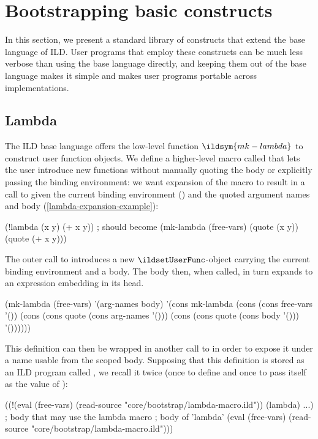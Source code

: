 \section{Bootstrapping basic constructs}
\label{bootstrapping-basic}
In this section, we present a standard library
of constructs that extend the base language of ILD. User programs that employ
these constructs can be much less verbose than using the base language directly,
and keeping them out of the base language makes it simple and makes user programs
portable
across implementations.
\subsection{Lambda}
\label{lambda-macro}
The ILD base language offers the low-level function \(\ildsym{mk-lambda}\) to construct
user function objects. We define a higher-level macro called  that
lets the user introduce new functions without manually quoting the body or explicitly
passing the binding environment: we want expansion of the 
macro to result in a call to  given the current binding environment
() and the quoted argument names and body (\cref{lambda-expansion-example}):
\begin{listingbox}\begin{ildcode}
(!lambda (x y) (+ x y))
; should become
(mk-lambda (free-vars) (quote (x y))
  (quote (+ x y)))
\end{ildcode}\end{listingbox}
\label{lambda-expansion-example}
The outer call to  introduces a new \(\ildsetUserFunc\)-object
carrying the current binding environment
and a body. The body then, when called, in turn
expands to an expression embedding  in its head.
\begin{listingbox}\begin{ildcode}
(mk-lambda
  (free-vars)
  '(arg-names body)
  '(cons mk-lambda
    (cons (cons free-vars '())
      (cons (cons quote (cons arg-names '()))
        (cons (cons quote (cons body '()))
          '())))))
\end{ildcode}\end{listingbox}
\label{lambda-macro-def}
This definition can then be wrapped in another call to  in order to expose
it under a  name usable from the scoped body. Supposing that
this definition is stored as an ILD program called ,
we recall it twice (once to define  and once to pass itself as the
value of ):
\begin{listingbox}\begin{ildcode}
((!(eval (free-vars)
    (read-source
      "core/bootstrap/lambda-macro.ild"))
 (lambda)
  ...) ; body that may use the lambda macro
  ; body of 'lambda'
  (eval (free-vars)
    (read-source
      "core/bootstrap/lambda-macro.ild")))
\end{ildcode}\end{listingbox}
\label{lambda-wrap}
